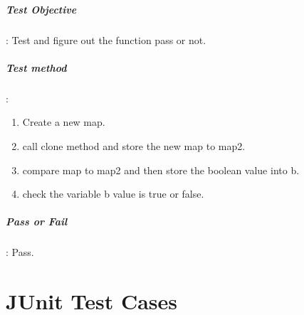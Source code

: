 \documentclass[12pt, a4paper]{report}
\begin{document}
\paragraph{Test Objective}: Test and figure out the function pass or not.
\paragraph{Test method}: 
\begin{enumerate}
	\item Create a new map.
	\item call clone method and store the new map to map2.
	\item compare map to map2 and then store the boolean value into b.
	\item check the variable b value is true or false. 
\end{enumerate}
\paragraph{Pass or Fail}: Pass.


\newpage
\appendix
\chapter{JUnit Test Cases} %
\label{cha:JTC}
\end{document}
